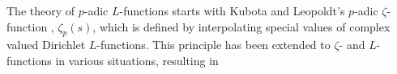 \documentclass{amsart}
\begin{document}
The theory of {$p$-adic{\futurelet{}}} {$L$-functions{\futurelet{}}} starts with Kubota and Leopoldt's
{$p$-adic{\futurelet{}}} $ {\zeta} $-function \cite{Kub-Leo}, $ {\zeta}_p(s) $, which is defined by
interpolating special values of complex valued Dirichlet {$L$-functions{\futurelet{}}}.
This principle has been extended to $ {\zeta} $- and {$L$-functions{\futurelet{}}} in various situations, resulting in 
\end{document}
